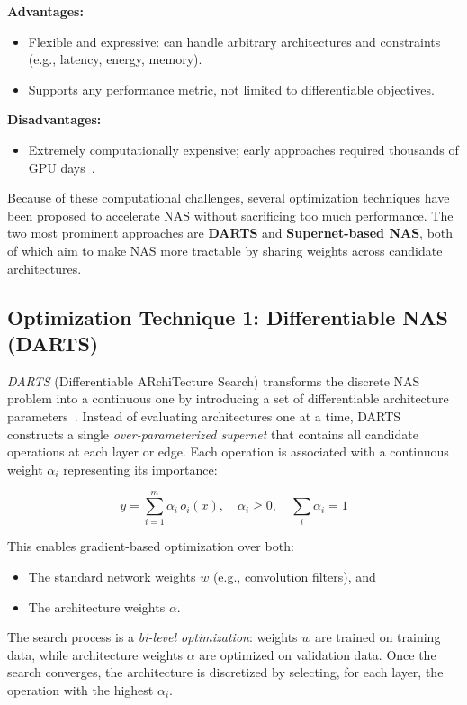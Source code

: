 \textbf{Advantages:}
\begin{itemize}
    \item Flexible and expressive: can handle arbitrary architectures and constraints (e.g., latency, energy, memory).
    \item Supports any performance metric, not limited to differentiable objectives.
\end{itemize}

\textbf{Disadvantages:}
\begin{itemize}
    \item Extremely computationally expensive; early approaches required thousands of GPU days~\cite{liu2018darts}.
    
\end{itemize}

Because of these computational challenges, several optimization techniques have been proposed to accelerate NAS without sacrificing too much performance. The two most prominent approaches are \textbf{DARTS} and \textbf{Supernet-based NAS}, both of which aim to make NAS more tractable by sharing weights across candidate architectures.

\subsection{Optimization Technique 1: Differentiable NAS (DARTS)}
\textit{DARTS} (Differentiable ARchiTecture Search) transforms the discrete NAS problem into a continuous one by introducing a set of differentiable architecture parameters~\cite{liu2018darts}. Instead of evaluating architectures one at a time, DARTS constructs a single \textit{over-parameterized supernet} that contains all candidate operations at each layer or edge. Each operation is associated with a continuous weight $\alpha_i$ representing its importance:

\begin{equation}
y = \sum_{i=1}^{m} \alpha_i \, o_i(x), \quad \alpha_i \geq 0, \quad \sum_{i} \alpha_i = 1
\end{equation}

This enables gradient-based optimization over both:
\begin{itemize}
    \item The standard network weights $w$ (e.g., convolution filters), and
    \item The architecture weights $\alpha$.
\end{itemize}

The search process is a \textit{bi-level optimization}: weights $w$ are trained on training data, while architecture weights $\alpha$ are optimized on validation data. Once the search converges, the architecture is discretized by selecting, for each layer, the operation with the highest $\alpha_i$.

